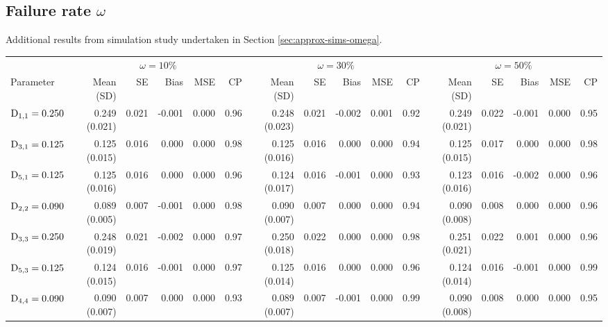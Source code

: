 \thispagestyle{empty}
\begin{landscape}
\subsection{Failure rate \texorpdfstring{$\omega$}{omega}}\label{sec:appendix-MVJMresults-omega}
Additional results from simulation study undertaken in Section \ref{sec:approx-sims-omega}.
\begin{table}[ht]
\centering
{}
\captionsetup{font=scriptsize}
\begingroup\scriptsize
\begin{tabular}{l|rrrrr:rrrrr:rrrrr}
  &&&\\ 
  Parameter & Mean (SD) & SE & Bias & MSE & CP & Mean (SD) & SE & Bias & MSE & CP & Mean (SD) & SE & Bias & MSE & CP \\ 
  \hline
  $\mathrm{D}_{1,1} = 0.250$ &  0.249 (0.021) & 0.021 & -0.001 & 0.000 & 0.96 &  0.248 (0.023) & 0.021 & -0.002 & 0.001 & 0.92 &  0.249 (0.021) & 0.022 & -0.001 & 0.000 & 0.95 \\ 
  $\mathrm{D}_{3,1} = 0.125$ &  0.125 (0.015) & 0.016 &  0.000 & 0.000 & 0.98 &  0.125 (0.016) & 0.016 &  0.000 & 0.000 & 0.94 &  0.125 (0.015) & 0.017 &  0.000 & 0.000 & 0.98 \\ 
  $\mathrm{D}_{5,1} = 0.125$ &  0.125 (0.016) & 0.016 &  0.000 & 0.000 & 0.96 &  0.124 (0.017) & 0.016 & -0.001 & 0.000 & 0.93 &  0.123 (0.016) & 0.016 & -0.002 & 0.000 & 0.96 \\ 
  $\mathrm{D}_{2,2} = 0.090$ &  0.089 (0.005) & 0.007 & -0.001 & 0.000 & 0.98 &  0.090 (0.007) & 0.007 &  0.000 & 0.000 & 0.94 &  0.090 (0.008) & 0.008 &  0.000 & 0.000 & 0.96 \\ 
  $\mathrm{D}_{3,3} = 0.250$ &  0.248 (0.019) & 0.021 & -0.002 & 0.000 & 0.97 &  0.250 (0.018) & 0.022 &  0.000 & 0.000 & 0.98 &  0.251 (0.021) & 0.022 &  0.001 & 0.000 & 0.96 \\ 
  $\mathrm{D}_{5,3} = 0.125$ &  0.124 (0.015) & 0.016 & -0.001 & 0.000 & 0.97 &  0.125 (0.014) & 0.016 &  0.000 & 0.000 & 0.96 &  0.124 (0.014) & 0.016 & -0.001 & 0.000 & 0.99 \\ 
  $\mathrm{D}_{4,4} = 0.090$ &  0.090 (0.007) & 0.007 &  0.000 & 0.000 & 0.93 &  0.089 (0.007) & 0.007 & -0.001 & 0.000 & 0.99 &  0.090 (0.008) & 0.008 &  0.000 & 0.000 & 0.95 \\ 

\end{tabular}
\end{table}
\end{landscape}
